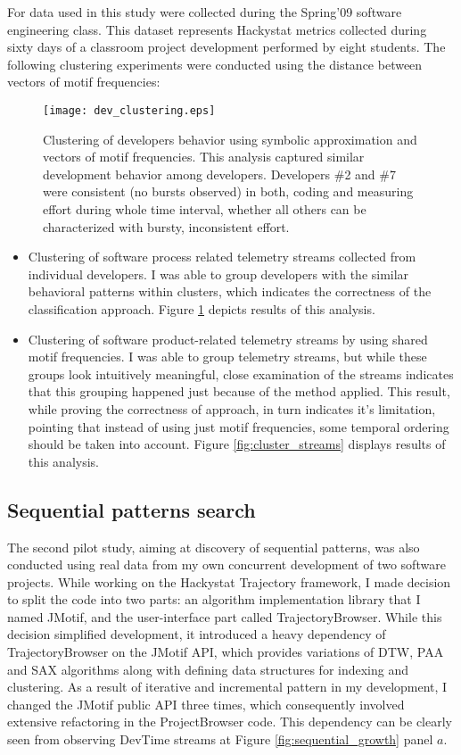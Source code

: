 For data used in this study were collected during the Spring'09 software engineering class. This dataset represents Hackystat metrics collected during sixty days of a classroom project development performed by eight students. The following clustering experiments were conducted using the distance between vectors of motif frequencies:

\begin{figure}[tbp]
   \centering
   \texttt{[image: dev\_clustering.eps]}
   \caption{Clustering of developers behavior using symbolic approximation and vectors of motif frequencies. This analysis captured similar development behavior among developers. Developers \#2 and \#7 were consistent (no bursts observed) in both, coding and measuring effort during whole time interval, whether all others can be characterized with bursty, inconsistent effort.}
   \label{fig:cluster_developers}
\end{figure}

\begin{itemize}
	\item Clustering of software process related telemetry streams collected from individual developers. I was able to group developers with the similar behavioral patterns within clusters, which indicates the correctness of the classification approach. Figure \ref{fig:cluster_developers} depicts results of this analysis.
	\item Clustering of software product-related telemetry streams by using shared motif frequencies. I was able to group telemetry streams, but while these groups look intuitively meaningful, close examination of the streams indicates that this grouping happened just because of the method applied. This result, while proving the correctness of approach, in turn indicates it's limitation, pointing that instead of using just motif frequencies, some temporal ordering should be taken into account. Figure \ref{fig:cluster_streams} displays results of this analysis.
\end{itemize}

\subsection{Sequential patterns search}
The second pilot study, aiming at discovery of sequential patterns, was also conducted using real data from my own concurrent development of two software projects. While working on the Hackystat Trajectory framework, I made decision to split the code into two parts: an algorithm implementation library that I named JMotif, and the user-interface part called TrajectoryBrowser. While this decision simplified development, it introduced a heavy dependency of TrajectoryBrowser on the JMotif API, which provides variations of DTW, PAA and SAX algorithms along with defining data structures for indexing and clustering. As a result of iterative and incremental pattern in my development, I changed the JMotif public API three times, which consequently involved extensive refactoring in the ProjectBrowser code. This dependency can be clearly seen from observing DevTime streams at Figure \ref{fig:sequential_growth} panel $a$. 

